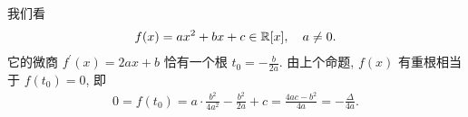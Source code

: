 \begin{example}
    我们看
    \begin{align*}
        f(x) = ax^2 + bx + c \in \mathbb{R}[x], \quad a \neq 0.
    \end{align*}
    它的微商 $f^{\prime} (x) = 2ax + b$ 恰有一个根 $t_0 = -\frac{b}{2a}$. 由上个命题, $f(x)$ 有重根相当于 $f(t_0) = 0$, 即
    \begin{align*}
        0 = f(t_0) = a \cdot \frac{b^2}{4a^2} - \frac{b^2}{2a} + c = \frac{4ac - b^2}{4a} = -\frac{\Delta}{4a}.
    \end{align*}
\end{example}
